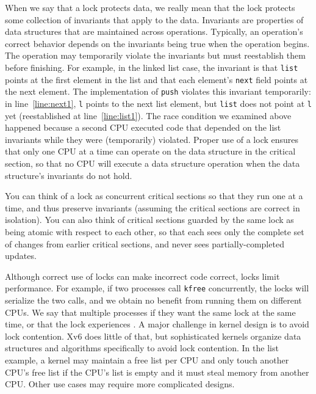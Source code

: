 When we say that a lock protects data, we really mean
that the lock protects some collection of invariants
that apply to the data.
Invariants are properties of data structures that
are maintained across operations.
Typically, an operation's correct behavior depends
on the invariants being true when the operation
begins.  The operation may temporarily violate
the invariants but must reestablish them before
finishing.
For example, in the linked list case, the invariant is that
\lstinline{list}
points at the first element in the list
and that each element's
\lstinline{next}
field points at the next element.
The implementation of
\lstinline{push}
violates this invariant temporarily: in line~\ref{line:next1},
\lstinline{l}
points
to the next list element, but
\lstinline{list}
does not point at
\lstinline{l}
yet (reestablished at line~\ref{line:list1}).
The race condition we examined above
happened because a second CPU executed
code that depended on the list invariants
while they were (temporarily) violated.
Proper use of a lock ensures that only one CPU at a time
can operate on the data structure in the critical section, so that
no CPU will execute a data structure operation when the 
data structure's invariants do not hold.

You can think of a lock as
concurrent critical sections so that they run one at a time,
and thus preserve invariants (assuming the critical sections
are correct in isolation).
You can also think of critical sections guarded by the same lock as being
atomic with respect to each other,
so that each sees only the complete set of
changes from earlier critical sections, and never sees
partially-completed updates.

Although correct use of locks can make incorrect code correct, locks
limit performance.  For example, if two processes call {\tt kfree}
concurrently, the locks will serialize the two calls, and we obtain no
benefit from running them on different CPUs.  We say that multiple
processes  if they want the same lock at the same
time, or that the lock experiences .  A major
challenge in kernel design is to avoid lock contention.  Xv6 does
little of that, but sophisticated kernels organize
data structures and algorithms specifically to avoid lock contention.  In the list
example, a kernel may maintain a free list per CPU and only touch
another CPU's free list if the CPU's list is empty and it must steal
memory from another CPU.  Other use cases may require more
complicated designs.

